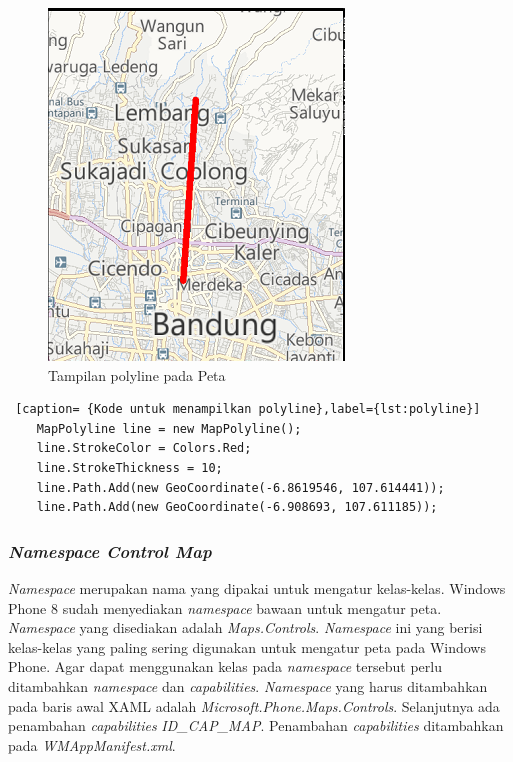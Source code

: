 \begin{figure}[h]
	\centering
		\includegraphics[scale=0.5]{Gambar/kontrol/polyline}
	\caption{Tampilan polyline pada Peta}
	\label{fig:TampilanpolylinepadaPeta}
\end{figure}

\begin{lstlisting} [caption= {Kode untuk menampilkan polyline},label={lst:polyline}]
	MapPolyline line = new MapPolyline();
	line.StrokeColor = Colors.Red;
	line.StrokeThickness = 10;
	line.Path.Add(new GeoCoordinate(-6.8619546, 107.614441));
	line.Path.Add(new GeoCoordinate(-6.908693, 107.611185));
\end{lstlisting}

\subsubsection{\textit{Namespace Control Map}}
\label{subsubsec:Namespace Control Map}
\hspace{0.5cm} \textit{Namespace} merupakan nama yang dipakai untuk mengatur kelas-kelas. Windows Phone 8 sudah menyediakan \textit{namespace} bawaan untuk mengatur peta. \textit{Namespace} yang disediakan adalah \textit{Maps.Controls}. \textit{Namespace} ini yang berisi kelas-kelas yang paling sering digunakan untuk mengatur peta pada Windows Phone.  Agar dapat menggunakan kelas pada \textit{namespace} tersebut perlu ditambahkan \textit{namespace} dan \textit{capabilities}. \textit{Namespace} yang harus ditambahkan pada baris awal XAML adalah \textit{Microsoft.Phone.Maps.Controls}. Selanjutnya ada penambahan \textit{capabilities} \textit{ID\_CAP\_MAP}. Penambahan \textit{capabilities} ditambahkan pada \textit{WMAppManifest.xml}.

